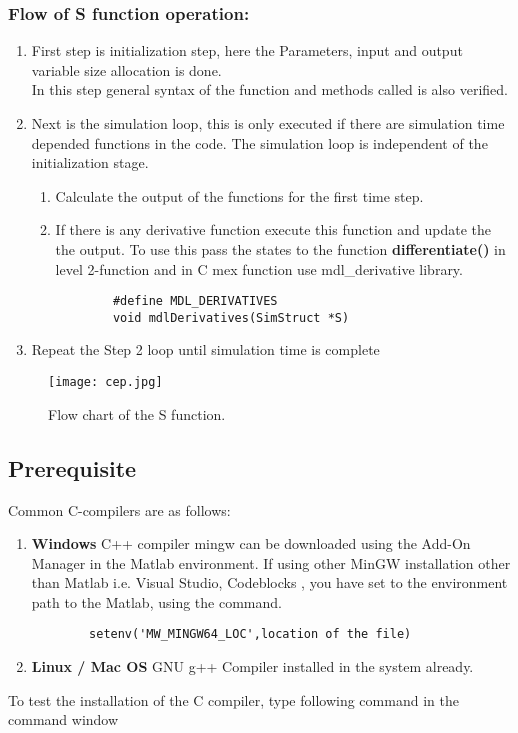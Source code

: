 \documentclass{article}
\begin{document}
\subsubsection*{Flow of S function operation:}
\begin{enumerate}[label=Step \arabic*]
    \item First step is initialization step, here the Parameters, input and output variable size allocation is done.\\ In this step general syntax of the function and methods called is also verified.
    \item Next is the simulation loop, this is only executed if there are simulation time depended functions in the code. The simulation loop is independent of the initialization stage.
    \begin{enumerate}
        \item Calculate the output of the functions for the first time step.  
        \item If there is any derivative function execute this function and update the the output.
        To use this pass the states to the function \textbf{differentiate()} in level 2-function and in C mex function use mdl\_derivative library.
        \begin{verbatim}
        #define MDL_DERIVATIVES
        void mdlDerivatives(SimStruct *S)
        \end{verbatim}
    \end{enumerate}
    \item Repeat the Step 2 loop until simulation time is complete
\end{enumerate}
\begin{figure}[H]
    \centering
    \texttt{[image: cep.jpg]}
    \caption{Flow chart of the S function.}
    \label{fig:my_label}
\end{figure}
\subsection{Prerequisite }
Common C-compilers are as follows:
\begin{enumerate}
    \item \textbf{Windows} C++ compiler mingw can be downloaded using the Add-On Manager in the Matlab environment.
    If using other MinGW installation other than Matlab i.e. Visual Studio, Codeblocks , you have set to the environment path to the Matlab, using the command.
    \begin{verbatim}
        setenv('MW_MINGW64_LOC',location of the file)
    \end{verbatim}
    \item \textbf{Linux / Mac OS} GNU g++ Compiler installed in the system already.
\end{enumerate}
To test the installation of the C compiler, type following command in the command window
\end{document}
